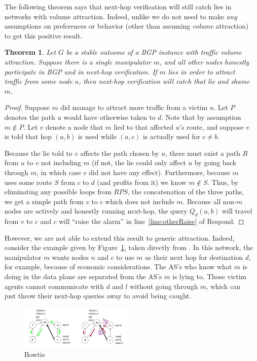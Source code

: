 \documentclass[pdftex,twoside,twocolumn,10pt,letterpaper]{article}
\newtheorem{theorem}{Theorem}
\begin{document}
  The following theorem says that next-hop verification will still catch lies
  in networks with volume attraction.
  Indeed, unlike \cite{Attraction} we do not need to make \emph{any} assumptions
  on preferences or behavior (other than assuming \emph{volume} attraction)
  to get this positive result.
  \begin{theorem}
    Let $G$ be a stable outcome of a BGP instance with traffic volume attraction.
    Suppose there is a single manipulator $m$,
    and all other nodes honestly participate in BGP and in next-hop verification.
    If $m$ lies in order to attract traffic from some node $u$,
    then next-hop verification will catch that lie and shame $m$.
  \end{theorem}
  \begin{proof}
    Suppose $m$ did manage to attract more traffic from a victim $u$.
    Let $P$ denotes the path $u$ would have otherwise taken to $d$.
    Note that by assumption $m\notin P$.
    Let $v$ denote a node that $m$ lied to that affected $u$'s route,
    and suppose $v$ is told
    that hop $(a,b)$ is used while $(a,c)$ is actually used for $c\ne b$.

    Because the lie told to $v$ affects the path chosen by $u$,
    there must exist a path $R$ from $u$ to $v$ not including $m$
    (if not, the lie could only affect $u$ by going back through $m$,
    in which case $v$ did not have any effect).
    Furthermore, because $m$ uses some route $S$ from $c$ to $d$
    (and profits from it) we know $m\notin S$.
    Thus, by eliminating any possible loops from $RPS$,
    the concatenation of the three paths,
    we get a simple path from $v$ to $c$ which does not include $m$.
    Because all non-$m$ nodes are actively and honestly running next-hop,
    the query $Q_d(a,b)$ will travel from $v$ to $c$ and $c$ will
    ``raise the alarm'' in line~\ref{line:otherRaise} of {\sc Respond}.
  \end{proof}

  However, we are not able to extend this result to generic attraction.
  Indeed, consider the example given by Figure~\ref{fig:Bowtie},
  taken directly from \cite{Attraction}.
  In this network, the manipulator $m$ wants nodes $n$ and $c$
  to use $m$ as their next hop for destination $d$,
  for example, because of economic considerations.
  The AS's who know what $m$ is doing in the data plane
  are separated from the AS's $m$ is lying to.
  Those victim agents cannot communicate with $d$ and $l$ without
  going through $m$, which can just throw their next-hop queries away
  to avoid being caught.
  \begin{figure}[h]
    \centering
    \caption{Bowtie}\label{fig:Bowtie}
    \includegraphics[width=0.5\textwidth]{Bowtie}
  \end{figure}
\end{document}
